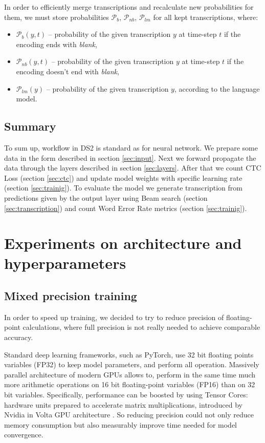 \documentclass[licencjacka,en]{pracamgr}
\begin{document}
In order to efficiently merge transcriptions and recalculate new probabilities for them, we must store probabilities $\mathcal{P}_{b}$, $\mathcal{P}_{nb}$, $\mathcal{P}_{lm}$ for all kept transcriptions, where:
\begin{itemize}
\item $\mathcal{P}_{b}(y, t)$ -- probability of the given transcription $y$ at time-step $t$ if the encoding ends with \textit{blank},
\item $\mathcal{P}_{nb}(y, t)$ -- probability of the given transcription $y$ at time-step $t$ if the encoding doesn't end with \textit{blank},
\item $\mathcal{P}_{lm}(y)$ -- probability of the given transcription $y$, according to the language model.\\
\end{itemize}

\section{Summary}
To sum up, workflow in DS2 is standard as for neural network. We prepare some data in the form described in section \ref{sec:input}. Next we forward propagate the data through the layers described in section \ref{sec:layers}. After that we count CTC Loss (section \ref{sec:ctc}) and update model weights with specific learning rate (section \ref{sec:trainig}). To evaluate the model we generate transcription from predictions given by the output layer using Beam search (section \ref{sec:transcription}) and count Word Error Rate metrics (section \ref{sec:trainig}).


\chapter{Experiments on architecture and hyperparameters}\label{r:experiments}

\section{Mixed precision training}
In order to speed up training, we decided to try to reduce precision of floating-point calculations, where full precision is not really needed to achieve comparable accuracy.

Standard deep learning frameworks, such as PyTorch, use 32 bit floating points variables (FP32) to keep model parameters, and perform all operation. Massively parallel architecture of modern GPUs allows to, perform in the same time much more arithmetic operations on 16 bit floating-point variables (FP16) than on 32 bit variables.
Specifically, performance can be boosted by using Tensor Cores: hardware units prepared to accelerate matrix multiplications, introduced by Nvidia in Volta GPU architecture \cite{MPT}.
So reducing precision could not only reduce memory consumption but also measurably improve time needed for model convergence.
\end{document}
